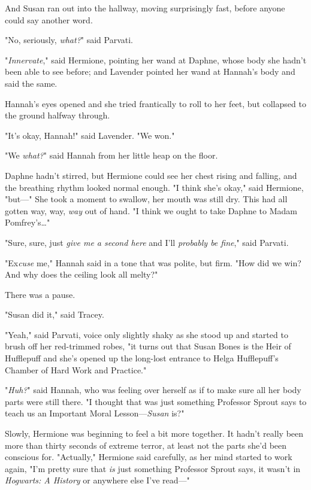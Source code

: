 And Susan ran out into the hallway, moving surprisingly fast, before anyone 
could say another word.

"No, seriously, \emph{what?}" said Parvati.

"\emph{Innervate}," said Hermione, pointing her wand at Daphne, whose body she 
hadn't been able to see before; and Lavender pointed her wand at Hannah's body 
and said the same.

Hannah's eyes opened and she tried frantically to roll to her feet, but 
collapsed to the ground halfway through.

"It's okay, Hannah!" said Lavender. "We won."

"We \emph{what?}" said Hannah from her little heap on the floor.

Daphne hadn't stirred, but Hermione could see her chest rising and falling, and 
the breathing rhythm looked normal enough. "I think she's okay," said Hermione, 
"but---" She took a moment to swallow, her mouth was still dry. This had all 
gotten way, way, \emph{way} out of hand. "I think we ought to take Daphne to 
Madam Pomfrey's{\ldots}"

"Sure, sure, just \emph{give me a second here} and I'll \emph{probably be 
fine}," said Parvati.

"Ex\emph{cuse} me," Hannah said in a tone that was polite, but firm. "How did 
we win? And why does the ceiling look all melty?"

There was a pause.

"Susan did it," said Tracey.

"Yeah," said Parvati, voice only slightly shaky as she stood up and started to 
brush off her red-trimmed robes, "it turns out that Susan Bones is the Heir of 
Hufflepuff and she's opened up the long-lost entrance to Helga Hufflepuff's 
Chamber of Hard Work and Practice."

"\emph{Huh?}" said Hannah, who was feeling over herself as if to make sure all 
her body parts were still there. "I thought that was just something Professor 
Sprout says to teach us an Important Moral Lesson---\emph{Susan} is?"

Slowly, Hermione was beginning to feel a bit more together. It hadn't really 
been more than thirty seconds of extreme terror, at least not the parts she'd 
been conscious for. "Actually," Hermione said carefully, as her mind started to 
work again, "I'm pretty sure that \emph{is} just something Professor Sprout 
says, it wasn't in \emph{Hogwarts: A History} or anywhere else I've read---"

